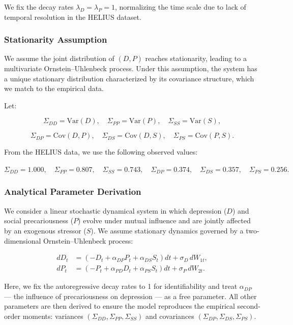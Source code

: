 \documentclass[
]{article}
\begin{document}
We fix the decay rates \(\lambda_D = \lambda_P = 1\), normalizing the
time scale due to lack of temporal resolution in the HELIUS dataset.

\subsubsection{Stationarity Assumption}\label{stationarity-assumption}

We assume the joint distribution of \((D, P)\) reaches stationarity,
leading to a multivariate Ornstein--Uhlenbeck process. Under this
assumption, the system has a unique stationary distribution
characterized by its covariance structure, which we match to the
empirical data.

Let:

\[
\Sigma_{DD} = \mathrm{Var}(D), \quad \Sigma_{PP} = \mathrm{Var}(P), \quad \Sigma_{SS} = \mathrm{Var}(S),
\]

\[
\Sigma_{DP} = \mathrm{Cov}(D, P), \quad \Sigma_{DS} = \mathrm{Cov}(D, S), \quad \Sigma_{PS} = \mathrm{Cov}(P, S).
\]

From the HELIUS data, we use the following observed values:

\(\Sigma_{DD} = 1.000, \quad \Sigma_{PP} = 0.807, \quad \Sigma_{SS} = 0.743, \quad \Sigma_{DP} = 0.374, \quad \Sigma_{DS} = 0.357, \quad \Sigma_{PS} = 0.256.\)

\subsubsection{Analytical Parameter
Derivation}\label{analytical-parameter-derivation}

We consider a linear stochastic dynamical system in which depression
(\(D\)) and social precariousness (\(P\)) evolve under mutual influence
and are jointly affected by an exogenous stressor (\(S\)). We assume
stationary dynamics governed by a two-dimensional Ornstein--Uhlenbeck
process:

\[
\begin{aligned}
dD_t &= \left(-D_t + \alpha_{DP} P_t + \alpha_{DS} S_t\right)dt + \sigma_D\, dW_{1t}, \\
dP_t &= \left(-P_t + \alpha_{PD} D_t + \alpha_{PS} S_t\right)dt + \sigma_P\, dW_{2t}.
\end{aligned}
\]

Here, we fix the autoregressive decay rates to 1 for identifiability and
treat \(\alpha_{DP}\) --- the influence of precariousness on depression
--- as a free parameter. All other parameters are then derived to ensure
the model reproduces the empirical second-order moments: variances
\((\Sigma_{DD}, \Sigma_{PP}, \Sigma_{SS})\) and covariances
\((\Sigma_{DP}, \Sigma_{DS}, \Sigma_{PS})\).
\end{document}
